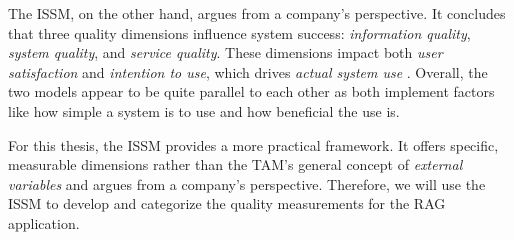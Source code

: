 \documentclass[
	english,
	ruledheaders=section,%
	class=report,%
	thesis={type=bachelor},%
	accentcolor=1b,%
	custommargins=true,%
	marginpar=false,%
	parskip=half-,%
	fontsize=11pt,%
	DIV=14,
]{tudapub}
\begin{document}
The ISSM, on the other hand, argues from a company's perspective. It concludes that three quality dimensions influence system success: \textit{information quality}, \textit{system quality}, and \textit{service quality}. These dimensions impact both \textit{user satisfaction} and \textit{ intention to use}, which drives \textit{actual system use} \parencite[pp.~22-23]{DeloneMcLean2003ISSuccessTenYearUpdate}. Overall, the two models appear to be quite parallel to each other as both implement factors like how simple a system is to use and how beneficial the use is.

For this thesis, the ISSM provides a more practical framework. It offers specific, measurable dimensions rather than the TAM's general concept of \textit{external variables} and argues from a company's perspective. Therefore, we will use the ISSM to develop and categorize the quality measurements for the RAG application.

\newpage
\end{document}

